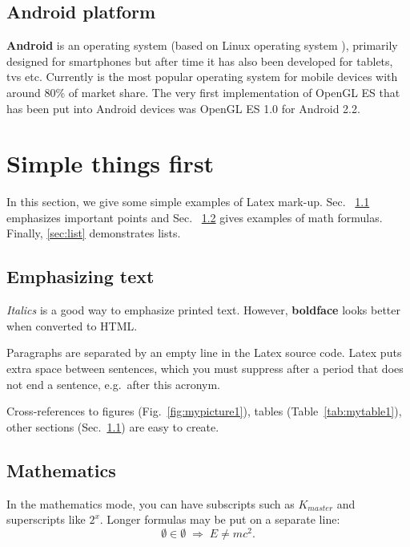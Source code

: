 \documentclass[a4paper,12pt]{article}
\begin{document}
\subsection{Android platform} %
\textbf{Android} \cite{androidcom} is an operating system (based on Linux operating system \cite{gnulinux}), primarily designed for smartphones but after time it has also been developed for tablets, tvs etc.
Currently is the most popular operating system for mobile devices with around 80\% of market share.
The very first implementation of OpenGL ES that has been put into Android devices was OpenGL ES 1.0 for Android 2.2.



\pagebreak[3]
\section{Simple things first}

In this section, we give some simple examples of Latex mark-up.
Sec. ~\ref{sec:emphasis} emphasizes important points and
Sec. ~\ref{sec:math} gives examples of math formulas.
Finally, \ref{sec:list} demonstrates lists.




\subsection{Emphasizing text}\label{sec:emphasis}

\textit{Italics} is a good way to emphasize printed text. However,
\textbf{boldface} looks better when converted to HTML.

Paragraphs are separated by an empty line in the Latex source code.
Latex puts extra space between sentences, which you must suppress
after a period that does not end a sentence, e.g.\ after this acronym.

Cross-references to figures (Fig.~\ref{fig:mypicture1}), tables
(Table~\ref{tab:mytable1}), other sections (Sec.~\ref{sec:emphasis})
are easy to create. 




\subsection{Mathematics}\label{sec:math}

In the mathematics mode, you can have subscripts such as $K_{master}$
and superscripts like $2^x$. Longer formulas may be put on a separate
line:
\[ \emptyset \in \emptyset \; \Rightarrow \; E \neq mc^2. \]
\end{document}
